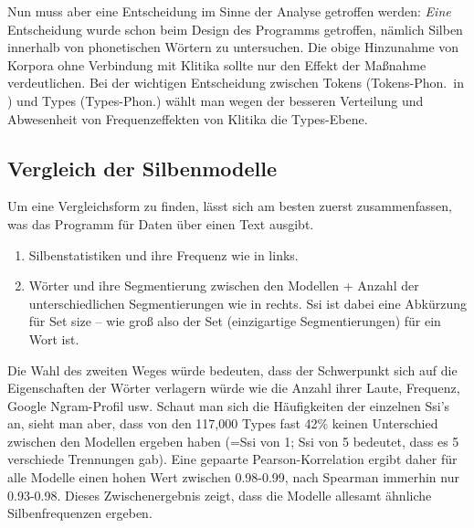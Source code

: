 \documentclass[12pt,headsepline,a4paper]{scrartcl}
\begin{document}
Nun muss aber eine Entscheidung im Sinne der Analyse getroffen werden: \textit{Eine} Entscheidung wurde schon beim Design des Programms getroffen, nämlich Silben innerhalb von phonetischen Wörtern zu untersuchen. Die obige Hinzunahme von Korpora ohne Verbindung mit Klitika sollte nur den Effekt der Maßnahme verdeutlichen.
Bei der wichtigen Entscheidung zwischen Tokens (Tokens-Phon.\ in ) und Types (Types-Phon.) wählt man wegen der besseren Verteilung und Abwesenheit von Frequenzeffekten von Klitika die Types-Ebene.

\subsection{Vergleich der Silbenmodelle}
Um eine Vergleichsform zu finden, lässt sich am besten zuerst zusammenfassen, was das Programm für Daten über einen Text ausgibt. 
\begin{enumerate}
  \item Silbenstatistiken und ihre Frequenz wie in  links.
  \item Wörter und ihre Segmentierung zwischen den Modellen + Anzahl der unterschiedlichen Segmentierungen wie in  rechts. Ssi ist dabei eine Abkürzung für Set size -- wie groß also der Set (einzigartige Segmentierungen) für ein Wort ist.
\end{enumerate}

Die Wahl des zweiten Weges würde bedeuten, dass der Schwerpunkt sich auf die Eigenschaften der Wörter verlagern würde wie die Anzahl ihrer Laute, Frequenz, Google Ngram-Profil usw. Schaut man sich die Häufigkeiten der einzelnen Ssi's an, sieht man aber, dass von den 117,000 Types fast 42\% keinen Unterschied zwischen den Modellen ergeben haben (=Ssi von 1; Ssi von 5 bedeutet, dass es 5 verschiede Trennungen gab). Eine gepaarte Pearson-Korrelation ergibt daher für alle Modelle einen hohen Wert zwischen 0.98-0.99, nach Spearman immerhin nur 0.93-0.98. Dieses Zwischenergebnis zeigt, dass die Modelle allesamt ähnliche Silbenfrequenzen ergeben.
 
\end{document}
